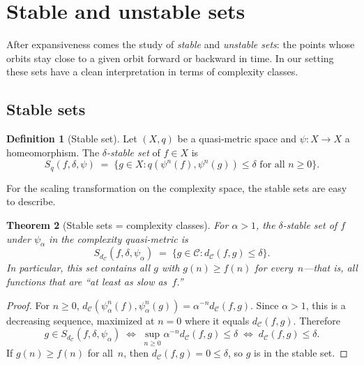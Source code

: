 \documentclass[11pt,a4paper]{article}
\theoremstyle{plain}
\newtheorem{theoreminner}{Theorem}[section]
\theoremstyle{definition}
\newtheorem{definitioninner}[theoreminner]{Definition}
\newenvironment{theorem}[1][]{\begin{theoreminner}[#1]}{\end{theoreminner}}
\newenvironment{definition}[1][]{\begin{definitioninner}[#1]}{\end{definitioninner}}
\newcommand{\C}{\mathcal{C}}
\begin{document}
\section{Stable and unstable sets}
\label{sec:stable-unstable}

After expansiveness comes the study of \emph{stable} and
\emph{unstable sets}: the points whose orbits stay close to a
given orbit forward or backward in time.  In our setting these
sets have a clean interpretation in terms of complexity classes.

\subsection{Stable sets}

\begin{definition}[Stable set]\label{def:stable}
Let $(X,q)$ be a quasi-metric space and $\psi\colon X\to X$ a
homeomorphism.  The \emph{$\delta$-stable set} of $f\in X$ is
\[
  S_q(f,\delta,\psi)
  \;=\; \{g\in X : q(\psi^n(f),\psi^n(g))\le\delta
    \text{ for all }n\ge 0\}.
\]
\end{definition}

For the scaling transformation on the complexity space, the stable
sets are easy to describe.

\begin{theorem}[Stable sets = complexity classes]\label{thm:stable-sets}
For $\alpha>1$, the $\delta$-stable set of $f$ under $\psi_\alpha$
in the complexity quasi-metric is
\[
  S_{d_\C}(f,\delta,\psi_\alpha)
  \;=\; \{g\in\C : d_\C(f,g)\le\delta\}.
\]
In particular, this set contains all $g$ with $g(n)\ge f(n)$ for
every~$n$---that is, all functions that are ``at least as slow
as~$f$.''
\end{theorem}

\begin{proof}
For $n\ge 0$, $d_\C(\psi_\alpha^n(f),\psi_\alpha^n(g))
=\alpha^{-n}d_\C(f,g)$.  Since $\alpha>1$, this is a decreasing
sequence, maximized at $n=0$ where it equals $d_\C(f,g)$.
Therefore
\[
  g\in S_{d_\C}(f,\delta,\psi_\alpha)
  \;\Longleftrightarrow\;
  \sup_{n\ge 0}\alpha^{-n}d_\C(f,g)\le\delta
  \;\Longleftrightarrow\;
  d_\C(f,g)\le\delta.
\]
If $g(n)\ge f(n)$ for all~$n$, then $d_\C(f,g)=0\le\delta$, so
$g$ is in the stable set.
\end{proof}
\end{document}
